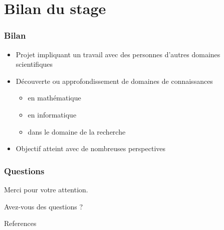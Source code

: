 \documentclass{beamer}
\theoremstyle{remark}
\theoremstyle{plain}
\begin{document}
\section{Bilan du stage}
\label{sec:partie6}

\begin{frame}
  \frametitle{Bilan}
  
   \begin{itemize}
        \item{Projet impliquant un travail avec des personnes d'autres domaines scientifiques}
        \vspace{0.5cm}
        \item{Découverte ou approfondissement de domaines de connaissances}
        \begin{itemize}%
            [triangle]
            \item{en mathématique}
            \item{en informatique}
            \item{dans le domaine de la recherche}
        \end{itemize}
        \vspace{0.5cm}
        \item{Objectif atteint avec de nombreuses perspectives}%
  \end{itemize}
  
  
   
\end{frame}


\begin{frame}
  \frametitle{Questions}
  \begin{center}
    Merci pour votre attention.

    Avez-vous des questions ?
  \end{center}
\end{frame}

\setcounter{lastframe}{\insertframenumber}

\begin{frame}[allowframebreaks]{References}


\end{frame}

\setcounter{framenumber}{\thelastframe}
\end{document}
